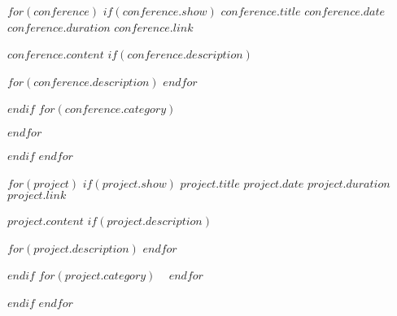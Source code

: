 \documentclass[a4paper]{article}
\begin{document}

$for(conference)$
$if(conference.show)$
\cvexperiencetitlesmalllink%
  {$conference.title$}%
  {$conference.date$}%
  {$conference.duration$}%
  {$conference.link$}%

\begin{cvexperience}%
  $conference.content$%
$if(conference.description)$

  \begin{cvexperiencedescription}%
$for(conference.description)$
$endfor$
  \end{cvexperiencedescription}%
$endif$
$for(conference.category)$

  \begin{cvexperiencetech}%
  \end{cvexperiencetech}%
$endfor$
\end{cvexperience}%

$endif$
$endfor$



$for(project)$
$if(project.show)$
\cvexperiencetitlesmalllink%
  {$project.title$ }%
  {$project.date$}%
  {$project.duration$}%
  {$project.link$}%

\begin{cvexperiencesingle}%
  $project.content$%
$if(project.description)$

  \begin{cvexperiencedescription}%
$for(project.description)$
$endfor$
  \end{cvexperiencedescription}%
$endif$
$for(project.category)$
  \ %
$endfor$
\end{cvexperiencesingle}%

$endif$
$endfor$

\end{document}
